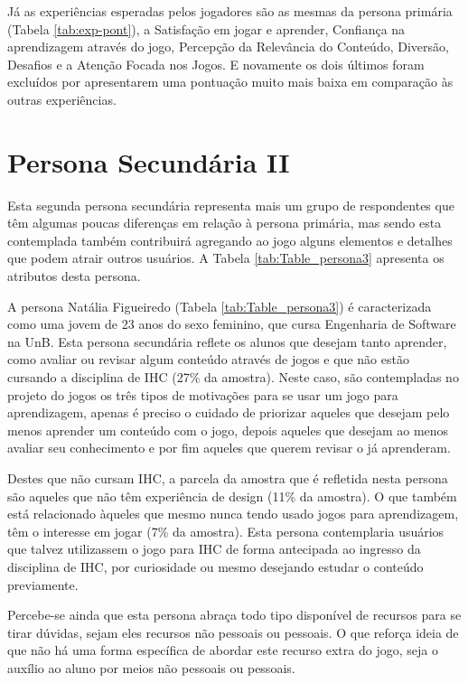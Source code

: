 Já as experiências esperadas pelos jogadores são as mesmas da persona primária (Tabela \ref{tab:exp-pont}), a Satisfação em jogar e aprender, Confiança na aprendizagem através do jogo, Percepção da Relevância do Conteúdo, Diversão, Desafios e a Atenção Focada nos Jogos. E novamente os dois últimos foram excluídos por apresentarem uma pontuação muito mais baixa em comparação às outras experiências. 

\section{Persona Secundária II}
\label{sec:p3}

Esta segunda persona secundária representa mais um grupo de respondentes que têm algumas poucas diferenças em relação à persona primária, mas sendo esta contemplada também contribuirá agregando ao jogo alguns elementos e detalhes que podem atrair outros usuários. A Tabela \ref{tab:Table_persona3} apresenta os atributos desta persona.



A persona Natália Figueiredo (Tabela \ref{tab:Table_persona3}) é caracterizada como uma jovem de 23 anos do sexo feminino, que cursa Engenharia de Software na UnB. Esta persona secundária reflete os alunos que desejam tanto aprender, como avaliar ou revisar algum conteúdo através de jogos e que não estão cursando a disciplina de IHC (27\% da amostra). Neste caso, são contempladas no projeto do jogos os três tipos de motivações para se usar um jogo para aprendizagem, apenas é preciso o cuidado de priorizar aqueles que desejam pelo menos aprender um conteúdo com o jogo, depois aqueles que desejam ao menos avaliar seu conhecimento e por fim aqueles que querem revisar o já aprenderam.

Destes que não cursam IHC, a parcela da amostra que é refletida nesta persona são aqueles que não têm experiência de design (11\% da amostra). O que também está relacionado àqueles que mesmo nunca tendo usado jogos para aprendizagem, têm o interesse em jogar (7\% da amostra). Esta persona contemplaria usuários que talvez utilizassem o jogo para IHC de forma antecipada ao ingresso da disciplina de IHC, por curiosidade ou mesmo desejando estudar o conteúdo previamente.

Percebe-se ainda que esta persona abraça todo tipo disponível de recursos para se tirar dúvidas, sejam eles recursos não pessoais ou pessoais. O que reforça ideia de que não há uma forma específica de abordar este recurso extra do jogo, seja o auxílio ao aluno por meios não pessoais ou pessoais.

